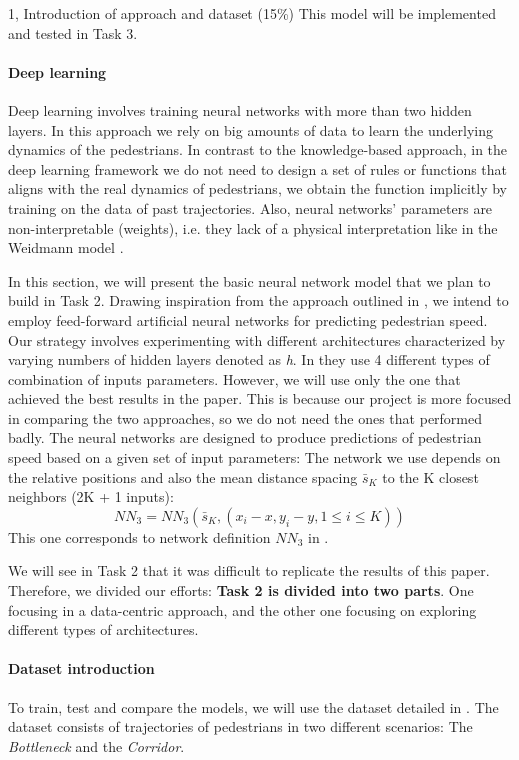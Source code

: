 \begin{task}{1, Introduction of approach and dataset (15\%)}
This model will be implemented and tested in Task 3.

\paragraph{Deep learning}
Deep learning involves training neural networks with more than two hidden layers. In this approach we rely on big amounts of data to learn the underlying dynamics of the pedestrians. In contrast to the knowledge-based approach, in the deep learning framework we do not need to design a set of rules or functions that aligns with the real dynamics of pedestrians, we obtain the function implicitly by training on the data of past trajectories. Also, neural networks' parameters are non-interpretable (weights), i.e. they lack of a physical interpretation like in the Weidmann model \cite{korbmacher2022review}.

In this section, we will present the basic neural network model that we plan to build in Task 2. Drawing inspiration from the approach outlined in \cite{tordeux2020prediction}, we intend to employ feed-forward artificial neural networks for predicting pedestrian speed. Our strategy involves experimenting with different architectures characterized by varying numbers of hidden layers denoted as \textit{h}. In \cite{tordeux2020prediction} they use 4 different types of combination of inputs parameters. However, we will use only the one that achieved the best results in the paper. This is because our project is more focused in comparing the two approaches, so we do not need the ones that performed badly. The neural networks are designed to produce predictions of pedestrian speed based on a given set of input parameters: The network we use depends on the relative positions and also the mean distance spacing \(\bar{s}_K\) to the K closest neighbors (2K + 1 inputs):
    \[
    NN_3 = NN_3(\bar{s}_K, (x_i - x, y_i - y, 1 \le i \le K))
    \]
This one corresponds to network definition \(NN_3\) in \cite{tordeux2020prediction}.

We will see in Task 2 that it was difficult to replicate the results of this paper. Therefore, we divided our efforts: \textbf{Task 2 is divided into two parts}. One focusing in a data-centric approach, and the other one focusing on exploring different types of architectures.

\paragraph{Dataset introduction}
To train, test and compare the models, we will use the dataset detailed in \cite{keip2009dokumentation}. The dataset consists of trajectories of pedestrians in two different scenarios: The \textit{Bottleneck} and the \textit{Corridor}. 


\end{task}
